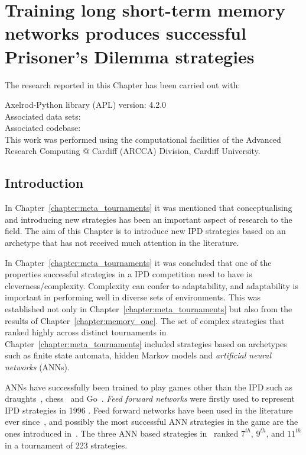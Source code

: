 \chapter{Training long short-term memory networks produces successful Prisoner's Dilemma strategies}\label{chapter:lstm}

\begin{center}
    The research reported in this Chapter has been carried out with:

    Axelrod-Python library (APL) version: 4.2.0 \\
    Associated data sets:~\cite{Glynatsi_2020_lstm_weights, Glynatsi_2020_training_data_sets} \\
    Associated codebase:~\cite{Glynatsi_2020_sensei} \\
    This work was performed using the computational facilities of the Advanced Research
    Computing @ Cardiff (ARCCA) Division, Cardiff University.\\ \vspace{.5cm} 
\end{center}

\hrulefill

\section{Introduction}

In Chapter~\ref{chapter:meta_tournaments} it was mentioned that conceptualising
and introducing new strategies has been an important aspect of research to the
field. The aim of this Chapter is to introduce new IPD strategies based on an
archetype that has not received much attention in the literature.

In Chapter~\ref{chapter:meta_tournaments} it was concluded that one of the
properties successful strategies in a IPD competition need to have is
cleverness/complexity. Complexity can confer to adaptability, and adaptability
is important in performing well in diverse sets of environments. This was
established not only in Chapter~\ref{chapter:meta_tournaments} but also from the
results of Chapter~\ref{chapter:memory_one}. The set of complex strategies that
ranked highly across distinct tournaments in
Chapter~\ref{chapter:meta_tournaments} included strategies based on archetypes
such as finite state automata, hidden Markov models and \textit{artificial
neural networks} (ANNs).

ANNs have successfully been trained to play games other than the IPD such as
draughts~\cite{Chellapilla1999}, chess~\cite{Fogel2004} and
Go~\cite{Silver2016}. \textit{Feed forward networks} were firstly used to represent IPD
strategies in 1996 \cite{Harrald1996}. Feed forward networks have been used in
the literature ever since~\cite{Ashlock2008, Ashlock2006a, Darwen2001,
Franken2005}, and possibly the most successful ANN strategies in the game are
the ones introduced in~\cite{Harper2017}. The three ANN based strategies
in~\cite{Harper2017} ranked \(7^{th}\), \(9^{th}\), and \(11^{th}\) in a
tournament of 223 strategies.

